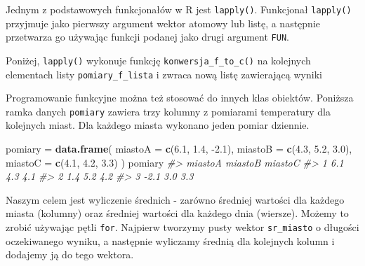 \documentclass[paper=6in:9in,pagesize=pdftex,headinclude=on,footinclude=on,10pt]{scrbook}
\newenvironment{Shaded}{\begin{snugshade}}{\end{snugshade}}
\newcommand{\CommentTok}[1]{\textcolor[rgb]{0.56,0.35,0.01}{\textit{#1}}}
\newcommand{\DataTypeTok}[1]{\textcolor[rgb]{0.13,0.29,0.53}{#1}}
\newcommand{\FloatTok}[1]{\textcolor[rgb]{0.00,0.00,0.81}{#1}}
\newcommand{\KeywordTok}[1]{\textcolor[rgb]{0.13,0.29,0.53}{\textbf{#1}}}
\newcommand{\NormalTok}[1]{#1}
\newcommand{\StringTok}[1]{\textcolor[rgb]{0.31,0.60,0.02}{#1}}
\begin{document}
Jednym z podstawowych funkcjonałów w R jest \texttt{lapply()}.
Funkcjonał \texttt{lapply()} przyjmuje jako pierwszy argument wektor atomowy lub listę, a następnie przetwarza go używając funkcji podanej jako drugi argument \texttt{FUN}.

Poniżej, \texttt{lapply()} wykonuje funkcję \texttt{konwersja\_f\_to\_c()} na kolejnych elementach listy \texttt{pomiary\_f\_lista} i zwraca nową listę zawierającą wyniki

\begin{Shaded}
\end{Shaded}

Programowanie funkcyjne można też stosować do innych klas obiektów.
Poniższa ramka danych \texttt{pomiary} zawiera trzy kolumny z pomiarami temperatury dla kolejnych miast.
Dla każdego miasta wykonano jeden pomiar dziennie.

\begin{Shaded}
\begin{Highlighting}[]
\NormalTok{pomiary =}\StringTok{ }\KeywordTok{data.frame}\NormalTok{(}
  \DataTypeTok{miastoA =} \KeywordTok{c}\NormalTok{(}\FloatTok{6.1}\NormalTok{, }\FloatTok{1.4}\NormalTok{, }\FloatTok{-2.1}\NormalTok{),}
  \DataTypeTok{miastoB =} \KeywordTok{c}\NormalTok{(}\FloatTok{4.3}\NormalTok{, }\FloatTok{5.2}\NormalTok{, }\FloatTok{3.0}\NormalTok{),}
  \DataTypeTok{miastoC =} \KeywordTok{c}\NormalTok{(}\FloatTok{4.1}\NormalTok{, }\FloatTok{4.2}\NormalTok{, }\FloatTok{3.3}\NormalTok{)}
\NormalTok{)}
\NormalTok{pomiary}
\CommentTok{#>   miastoA miastoB miastoC}
\CommentTok{#> 1     6.1     4.3     4.1}
\CommentTok{#> 2     1.4     5.2     4.2}
\CommentTok{#> 3    -2.1     3.0     3.3}
\end{Highlighting}
\end{Shaded}

Naszym celem jest wyliczenie średnich - zarówno średniej wartości dla każdego miasta (kolumny) oraz średniej wartości dla każdego dnia (wiersze).
Możemy to zrobić używając pętli \texttt{for}.
Najpierw tworzymy pusty wektor \texttt{sr\_miasto} o długości oczekiwanego wyniku, a następnie wyliczamy średnią dla kolejnych kolumn i dodajemy ją do tego wektora.
\end{document}

